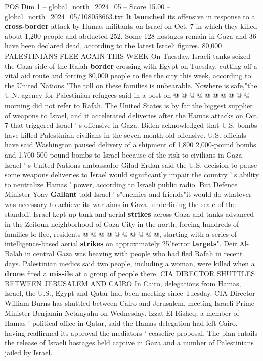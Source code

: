 \begin{textsample}{POS Dim 1 – global\_north\_2024\_05 – Score 15.00 – global\_north\_2024\_05/108058663.txt}
It \textbf{launched} its offensive in response to a \textbf{cross-border} attack by Hamas militants on Israel on Oct. 7 in which they killed about 1,200 people and abducted 252.
Some 128 hostages remain in Gaza and 36 have been declared dead, according to the latest Israeli figures. 80,000 PALESTINIANS FLEE AGAIN THIS WEEK On Tuesday, Israeli tanks seized the Gaza side of the Rafah \textbf{border} crossing with Egypt on Tuesday, cutting off a vital aid route and forcing 80,000 people to flee the city this week, according to the United Nations."The toll on these families is unbearable.
Nowhere is safe,"the U.N. agency for Palestinian refugees said in a post on @ @ @ @ @ @ @ @ @ @ morning did not refer to Rafah.
The United States is by far the biggest supplier of weapons to Israel, and it accelerated deliveries after the Hamas attacks on Oct. 7 that triggered Israel ' s offensive in Gaza.
Biden acknowledged that U.S. bombs have killed Palestinian civilians in the seven-month-old offensive.
U.S. officials have said Washington paused delivery of a shipment of 1,800 2,000-pound bombs and 1,700 500-pound bombs to Israel because of the risk to civilians in Gaza.
Israel ' s United Nations ambassador Gilad Erdan said the U.S. decision to pause some weapons deliveries to Israel would significantly impair the country ' s ability to neutralize Hamas ' power, according to Israeli public radio.
But Defence Minister Yoav \textbf{Gallant} told Israel ' s"enemies and friends"it would do whatever was necessary to achieve its war aims in Gaza, underlining the scale of the standoff.
Israel kept up tank and aerial \textbf{strikes} across Gaza and tanks advanced in the Zeitoun neighborhood of Gaza City in the north, forcing hundreds of families to flee, residents @ @ @ @ @ @ @ @ @ @, starting with a series of intelligence-based aerial \textbf{strikes} on approximately 25"terror \textbf{targets}".
Deir Al-Balah in central Gaza was heaving with people who had fled Rafah in recent days.
Palestinian medics said two people, including a woman, were killed when a \textbf{drone} fired a \textbf{missile} at a group of people there.
CIA DIRECTOR SHUTTLES BETWEEN JERUSALEM AND CAIRO In Cairo, delegations from Hamas, Israel, the U.S., Egypt and Qatar had been meeting since Tuesday.
CIA Director William Burns has shuttled between Cairo and Jerusalem, meeting Israeli Prime Minister Benjamin Netanyahu on Wednesday.
Izzat El-Risheq, a member of Hamas ' political office in Qatar, said the Hamas delegation had left Cairo, having reaffirmed its approval the mediators ' ceasefire proposal.
The plan entails the release of Israeli hostages held captive in Gaza and a number of Palestinians jailed by Israel.

\end{textsample}
